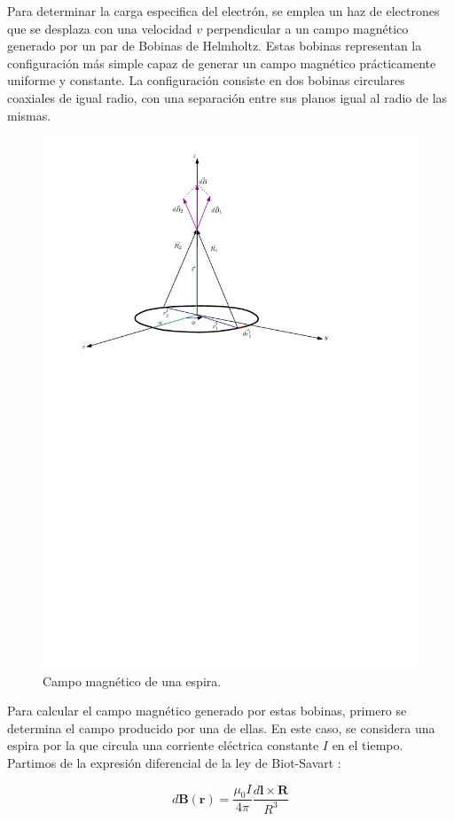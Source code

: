 Para determinar la carga especifica del electrón, se emplea un haz de
electrones que se desplaza con una velocidad \(v\) perpendicular a un campo
magnético generado por un par de Bobinas de Helmholtz.
Estas bobinas representan la configuración más simple capaz de generar un campo
magnético prácticamente uniforme y constante.
La configuración consiste en dos bobinas circulares coaxiales de igual radio,
con una separación entre sus planos igual al radio de las mismas.

\begin{figure}[htbp!]
  \centering
  \includegraphics[width=0.8\linewidth]{./images/loop-field.pdf}
  \caption{Campo magnético de una espira.}
  \label{fig:loop}
\end{figure}

Para calcular el campo magnético generado por estas bobinas, primero se
determina el campo producido por una de ellas.
En este caso, se considera una espira por la que circula una corriente eléctrica
constante \(I\) en el tiempo.
Partimos de la expresión diferencial de la ley de Biot-Savart \cite{jackson-1998}:

\begin{equation}\label{eq:Biot-Savart}
  d\mathbf{B}(\mathbf{r}) = \frac{\mu_0 I}{4 \pi} \frac{d\mathbf{l} \times \mathbf{R}}{R^{3}}
\end{equation}

